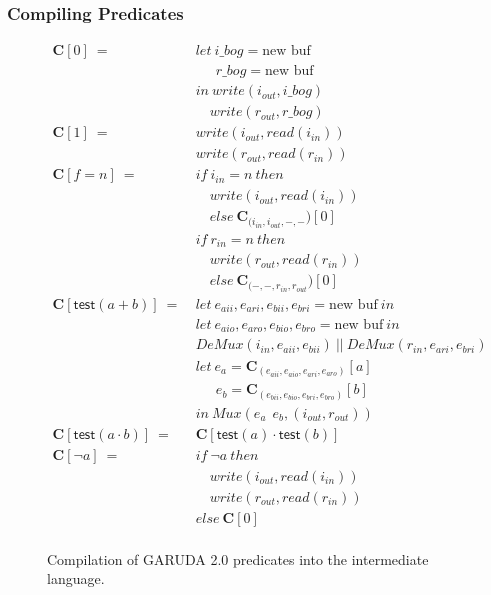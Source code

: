 \documentclass[12pt, letterpaper]{article}
\def \sysname {\textsc{GARUDA 2.0}\xspace}
\begin{document}
      \subsubsection{Compiling Predicates}\label{sec:compile:compile:pred}
        \begin{figure}
          \begin{align*}
            \mathbf{C}[0]\ 
              =\ &
              let\ i\_bog = \text{new buf}\\
              &\quad\ \ r\_bog = \text{new buf}\\
              &in\ write(i_{out}, i\_bog)\\
              &\quad  write(r_{out}, r\_bog)\\
            \mathbf{C}[1]\ 
              =\ &
              write(i_{out}, read(i_{in}))\\
              &write(r_{out}, read(r_{in}))
              \\
            \mathbf{C}[f = n]\
              =\
              &if\ i_{in}=n\ then\\
              &\quad write(i_{out}, read(i_{in}))\\
              &\quad else\ \mathbf{C}_{(i_{in}, i_{out}, -, -})[0]\\
              &if\ r_{in}=n\ then\\
              &\quad write(r_{out}, read(r_{in}))\\
              &\quad else\ \mathbf{C}_{(-, -, r_{in}, r_{out}})[0]\\
            \mathbf{C}[\mathsf{test}(a + b)]\ 
              =\ &
              let\ e_{aii}, e_{ari}, e_{bii}, e_{bri} = \text{new buf}\ in\\
              & let\ e_{aio}, e_{aro}, e_{bio}, e_{bro} = \text{new buf}\ in\\
                 &DeMux(i_{in}, e_{aii}, e_{bii})\ ||\ DeMux(r_{in}, e_{ari}, e_{bri})\\
              &let\ e_a = \mathbf{C}_{(e_{aii},e_{aio},e_{ari},e_{aro})}[a]\\
              &\quad\ \ e_b = \mathbf{C}_{(e_{bii},e_{bio},e_{bri},e_{bro})}[b]\\
              &in\ Mux(e_a\ \ e_b, (i_{out},r_{out}))\\
            \mathbf{C}[\mathsf{test}(a \cdot b)]\ 
              =\ &\mathbf{C}[\mathsf{test}(a) \cdot \mathsf{test}(b)] \\
            \mathbf{C}[\neg a]\ 
              =\ 
              &if\ \neg a\ then\\
              &\quad write(i_{out}, read(i_{in}))\\
              &\quad write(r_{out}, read(r_{in}))\\
              &else\ \mathbf{C}[0]\\
          \end{align*}
          \caption{Compilation of \sysname predicates into the intermediate language.}
          \label{fig:compile:compile:pred}
        \end{figure}
\end{document}
